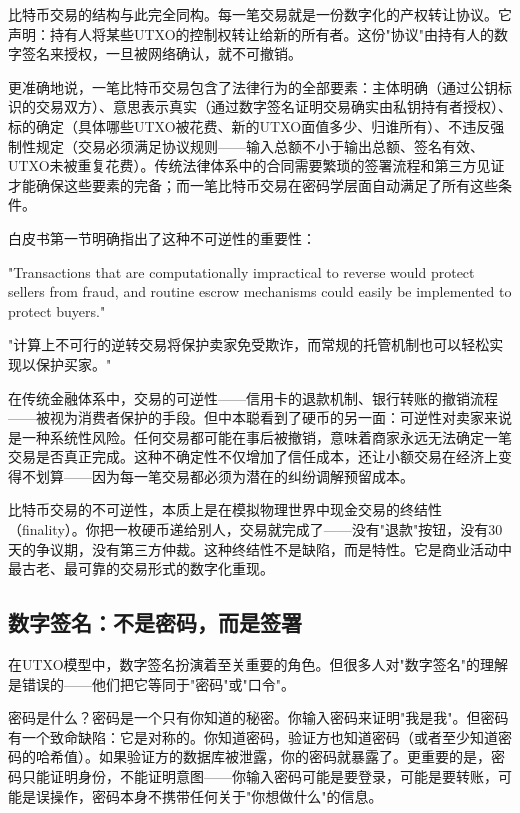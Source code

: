 \documentclass[a4paper,12pt,openany]{ctexbook}
\newenvironment{quoting}{%
  \par\vspace{0.5em}%
  \begin{list}{}{%
    \setlength{\leftmargin}{2em}%
    \setlength{\rightmargin}{2em}%
    \setlength{\parsep}{0.3em}%
    \setlength{\itemsep}{0pt}%
    \setlength{\topsep}{0pt}%
  }%
  \item\relax
}{%
  \end{list}%
  \par\vspace{0.5em}%
}
\begin{document}
比特币交易的结构与此完全同构。每一笔交易就是一份数字化的产权转让协议。它声明：持有人将某些UTXO的控制权转让给新的所有者。这份"协议"由持有人的数字签名来授权，一旦被网络确认，就不可撤销。

更准确地说，一笔比特币交易包含了法律行为的全部要素：主体明确（通过公钥标识的交易双方）、意思表示真实（通过数字签名证明交易确实由私钥持有者授权）、标的确定（具体哪些UTXO被花费、新的UTXO面值多少、归谁所有）、不违反强制性规定（交易必须满足协议规则——输入总额不小于输出总额、签名有效、UTXO未被重复花费）。传统法律体系中的合同需要繁琐的签署流程和第三方见证才能确保这些要素的完备；而一笔比特币交易在密码学层面自动满足了所有这些条件。

白皮书第一节明确指出了这种不可逆性的重要性：


\begin{quoting}
\small
"Transactions that are computationally impractical to reverse would protect sellers from fraud, and routine escrow mechanisms could easily be implemented to protect buyers."

"计算上不可行的逆转交易将保护卖家免受欺诈，而常规的托管机制也可以轻松实现以保护买家。"
\end{quoting}


在传统金融体系中，交易的可逆性——信用卡的退款机制、银行转账的撤销流程——被视为消费者保护的手段。但中本聪看到了硬币的另一面：可逆性对卖家来说是一种系统性风险。任何交易都可能在事后被撤销，意味着商家永远无法确定一笔交易是否真正完成。这种不确定性不仅增加了信任成本，还让小额交易在经济上变得不划算——因为每一笔交易都必须为潜在的纠纷调解预留成本。

比特币交易的不可逆性，本质上是在模拟物理世界中现金交易的终结性（finality）。你把一枚硬币递给别人，交易就完成了——没有"退款"按钮，没有30天的争议期，没有第三方仲裁。这种终结性不是缺陷，而是特性。它是商业活动中最古老、最可靠的交易形式的数字化重现。


\subsection*{数字签名：不是密码，而是签署}


在UTXO模型中，数字签名扮演着至关重要的角色。但很多人对"数字签名"的理解是错误的——他们把它等同于"密码"或"口令"。

密码是什么？密码是一个只有你知道的秘密。你输入密码来证明"我是我"。但密码有一个致命缺陷：它是对称的。你知道密码，验证方也知道密码（或者至少知道密码的哈希值）。如果验证方的数据库被泄露，你的密码就暴露了。更重要的是，密码只能证明身份，不能证明意图——你输入密码可能是要登录，可能是要转账，可能是误操作，密码本身不携带任何关于"你想做什么"的信息。
\end{document}
